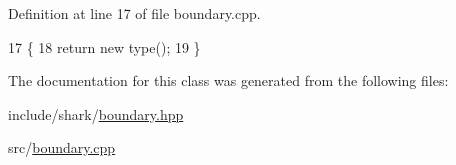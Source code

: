 Definition at line 17 of file boundary.\+cpp.


\begin{DoxyCode}
17                                                                  \{
18     \textcolor{keywordflow}{return} \textcolor{keyword}{new} type();
19 \}
\end{DoxyCode}


The documentation for this class was generated from the following files\+:\begin{DoxyCompactItemize}
\item 
include/shark/\hyperlink{boundary_8hpp}{boundary.\+hpp}\item 
src/\hyperlink{boundary_8cpp}{boundary.\+cpp}\end{DoxyCompactItemize}
